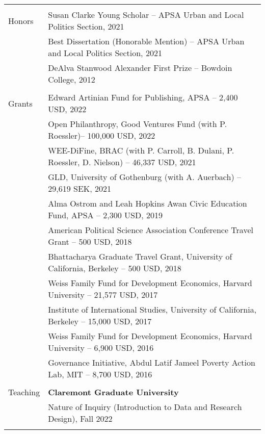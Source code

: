 \documentclass[letterpaper, 10pt]{article}
\begin{document}
\begin{longtable}{p{1in}p{5.5in}}
&\\




{{Honors}} 
& Susan Clarke Young Scholar  -- APSA Urban and Local Politics Section, 2021\\

& Best Dissertation  (Honorable Mention) --  APSA Urban and Local Politics Section, 2021 \\
& DeAlva Stanwood Alexander First Prize  --  Bowdoin College, 2012 \\

& \\

{{Grants}} 
& Edward Artinian Fund for Publishing, APSA -- 2,400 USD, 2022\\
& Open Philanthropy, Good Ventures Fund (with P. Roessler)-- 100,000 USD, 2022\\
& WEE-DiFine, BRAC (with P. Carroll, B. Dulani, P. Roessler,  D. Nielson)
 -- 46,337 USD, 2021\\


& GLD, University of Gothenburg (with A. Auerbach)
-- 29,619 SEK, 2021 \\


& Alma Ostrom and Leah Hopkins Awan Civic Education Fund, APSA -- 2,300 USD, 2019\\

& American Political Science Association Conference Travel Grant -- 500 USD, 2018 \\
& Bhattacharya Graduate Travel Grant,  University of California, Berkeley -- 500 USD, 2018\\


& Weiss Family Fund for Development Economics, Harvard University -- 21,577 USD, 2017
\\

&Institute of International Studies, University of California, Berkeley -- 15,000 USD, 2017 \\

&Weiss Family Fund for Development Economics, Harvard University -- 6,900 USD, 2016  \\

&Governance Initiative, Abdul Latif Jameel Poverty Action Lab, MIT -- 8,700 USD, 2016 \\

& \\



{{Teaching}}  & \textbf{Claremont Graduate University} \\
&Nature of Inquiry (Introduction to Data and Research Design), Fall 2022 \\
&\\


\end{longtable}
\end{document}
